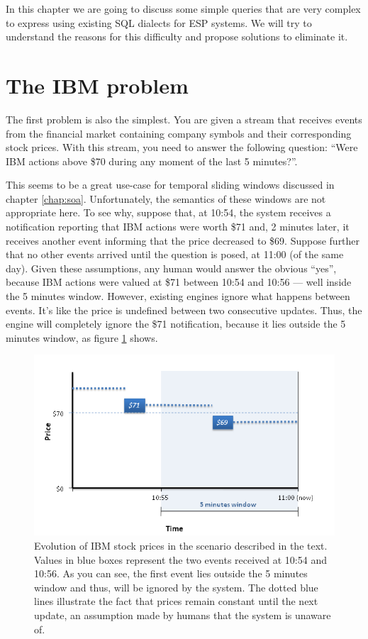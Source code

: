 \documentclass{report}
\begin{document}
In this chapter we are going to discuss some simple queries that are
very complex to express using existing SQL dialects for ESP
systems. We will try to understand the reasons for this difficulty and
propose solutions to eliminate it.

\section{The IBM problem}

The first problem is also the simplest. You are given a stream that
receives events from the financial market containing company symbols
and their corresponding stock prices. With this stream, you need to
answer the following question: ``Were IBM actions above \$70 during
any moment of the last 5 minutes?''.

This seems to be a great use-case for temporal sliding windows
discussed in chapter \ref{chap:soa}. Unfortunately, the semantics of
these windows are not appropriate here. To see why, suppose that, at
10:54, the system receives a notification reporting that IBM actions
were worth \$71 and, 2 minutes later, it receives another event
informing that the price decreased to \$69. Suppose further that no
other events arrived until the question is posed, at 11:00 (of the
same day). Given these assumptions, any human would answer the obvious
``yes'', because IBM actions were valued at \$71 between 10:54 and
10:56 --- well inside the 5 minutes window. However, existing engines
ignore what happens between events. It's like the price is undefined
between two consecutive updates. Thus, the engine will completely
ignore the \$71 notification, because it lies outside the 5 minutes
window, as figure \ref{fig:outside-window} shows.

\begin{figure}[htbp]
  \includegraphics[width=\textwidth]{outside-window.png}
  \caption{Evolution of IBM stock prices in the scenario described in
    the text. Values in blue boxes represent the two events received
    at 10:54 and 10:56. As you can see, the first event lies outside
    the 5 minutes window and thus, will be ignored by the system. The
    dotted blue lines illustrate the fact that prices remain constant
    until the next update, an assumption made by humans that the
    system is unaware of.}
  \label{fig:outside-window}
\end{figure}
\end{document}
